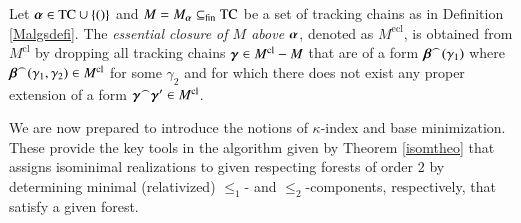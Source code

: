 \documentclass[3p,10pt,times]{elsarticle}
\newcommand{\al}{\alpha}
\newcommand{\alvec}{{\vec{\al}}}
\newcommand{\be}{\beta}
\newcommand{\bevec}{{\vec{\be}}}
\newcommand{\ga}{\gamma}
\newcommand{\gavec}{{\vec{\ga}}}
\newcommand{\gavecpr}{{\vec{\ga}'}}
\newcommand{\ka}{\kappa}
\newcommand{\finsub}{\subseteq_\mathrm{fin}}
\newcommand{\leo}{\le_1}
\newcommand{\TC}{{\mathrm{TC}}}
\newcommand{\letwo}{\le_2}
\newcommand{\Mcl}{M^{\operatorname{cl}}}
\newcommand{\Mecl}{M^{\operatorname{ecl}}}
\def\vec#1{\mathchoice{\mbox{\boldmath$\displaystyle#1$}}
{\mbox{\boldmath$\textstyle#1$}}
{\mbox{\boldmath$\scriptstyle#1$}}
{\mbox{\boldmath$\scriptscriptstyle#1$}}}
\begin{document}
\begin{defi}\label{esscldefi}
Let $\alvec\in\TC\cup\{()\}$ and $M=M_\alvec\finsub\TC$ be a set of tracking chains as in Definition \ref{Malgsdefi}. 
The \emph{essential closure of $M$ above $\alvec$}, denoted as $\Mecl$, is obtained from $\Mcl$ by dropping all tracking chains 
$\gavec\in\Mcl-M$ that are of a form $\bevec^\frown(\ga_1)$ where $\bevec^\frown(\ga_1,\ga_2)\in \Mcl$ for some $\ga_2$ and
for which there does not exist any proper extension of a form $\gavec^\frown\gavecpr\in\Mcl$.
\end{defi}

We are now prepared to introduce the notions of $\ka$-index and base minimization. These provide the key tools in the algorithm
given by Theorem \ref{isomtheo} that assigns isominimal realizations to given respecting forests of order $2$ by determining 
minimal (relativized) $\leo$- and $\letwo$-components, respectively, that satisfy a given forest.
\end{document}
